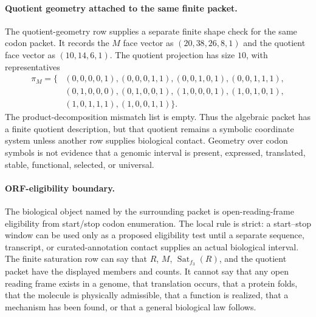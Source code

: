 \paragraph{Quotient geometry attached to the same finite packet.}
The quotient-geometry row supplies a separate finite shape check for the same codon packet.  It records the $M$ face vector as $(20,38,26,8,1)$ and the quotient face vector as $(10,14,6,1)$.  The quotient projection has size $10$, with representatives
$$
\begin{aligned}
\pi_M=\{&(0,0,0,0,1),(0,0,0,1,1),(0,0,1,0,1),(0,0,1,1,1),\nonumber\\
&(0,1,0,0,0),(0,1,0,0,1),(1,0,0,0,1),(1,0,1,0,1),\nonumber\\
&(1,0,1,1,1),(1,0,0,1,1)\}.
\end{aligned}
$$
The product-decomposition mismatch list is empty.  Thus the algebraic packet has a finite quotient description, but that quotient remains a symbolic coordinate system unless another row supplies biological contact.  Geometry over codon symbols is not evidence that a genomic interval is present, expressed, translated, stable, functional, selected, or universal.

\paragraph{ORF-eligibility boundary.}
The biological object named by the surrounding packet is open-reading-frame eligibility from start/stop codon enumeration.  The local rule is strict: a start--stop window can be used only as a proposed eligibility test until a separate sequence, transcript, or curated-annotation contact supplies an actual biological interval.  The finite saturation row can say that $R$, $M$, $\operatorname{Sat}_{f_3}(R)$, and the quotient packet have the displayed members and counts.  It cannot say that any open reading frame exists in a genome, that translation occurs, that a protein folds, that the molecule is physically admissible, that a function is realized, that a mechanism has been found, or that a general biological law follows.

